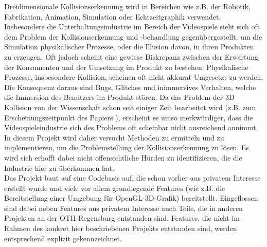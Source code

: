 
Dreidimensionale Kollisionserkennung wird in Bereichen wie z.B. der Robotik, Fabrikation, Animation, Simulation oder Echtzeitgraphik verwendet.
Insbesondere die Unterhaltungsindustrie im Bereich der Videospiele sieht sich oft dem Problem der Kollisionserkennung und -behandlung gegenübergestellt, um die Simulation physikalischer Prozesse, oder die Illusion davon, in ihren Produkten zu erzeugen.
Oft jedoch scheint eine gewisse Diskrepanz zwischen der Erwartung der Konsumenten und der Umsetzung im Produkt zu bestehen. Physikalische Prozesse, insbesondere Kollision, scheinen oft nicht akkurat Umgesetzt zu werden. Die Konsequenz daraus sind Bugs, Glitches und inimmersives Verhalten, welche die Immersion des Benutzers im Produkt stören.
Da das Problem der 3D Kollision von der Wissenschaft schon seit einiger Zeit bearbeitet wird (z.B. zum Erscheinungszeitpunkt des Papiers \cite{gjk}), erscheint es umso merkwürdiger, dass die Videospieleindustrie sich des Problems oft scheinbar nicht ausreichend annimmt.
In diesem Projekt wird daher versucht Methoden zu ermitteln und zu implementieren, um die Problemstellung der Kollisionserkennung zu lösen.
Es wird sich erhofft dabei nicht offensichtliche Hürden zu identifizieren, die die Industrie hier zu überkommen hat. \\
Das Projekt baut auf eine Codebasis auf, die schon vorher aus privatem Interesse erstellt wurde und viele vor allem grundlegende Features (wie z.B. die Bereitstellung einer Umgebung für OpenGL-3D-Grafik) bereitstellt. Eingeflossen sind dabei neben Features aus privatem Interesse auch Teile, die in anderen Projekten an der OTH Regensburg entstanden sind. Features, die nicht im Rahmen des konkret hier beschriebenen Projekts entstanden sind, werden entsprechend explizit gekennzeichnet.